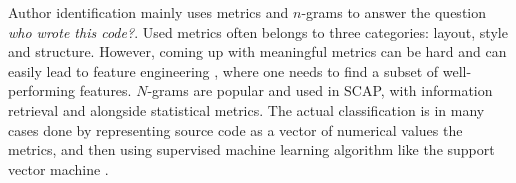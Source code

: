 Author identification mainly uses metrics and $n$-grams to answer the question \emph{who wrote this code?}. Used metrics often belongs to three categories: layout, style and structure. However, coming up with meaningful metrics can be hard and can easily lead to feature engineering \cite{EJPFSAI2004}, where one needs to find a subset of well-performing features. $N$-grams are popular and used in SCAP, with information retrieval and alongside statistical metrics. The actual classification is in many cases done by representing source code as a vector of numerical values \ie the metrics, and then using supervised machine learning algorithm like the support vector machine \cite{SDNAIJSP2015}. 
